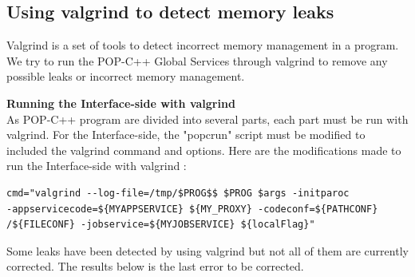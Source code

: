 \subsection{Using valgrind to detect memory leaks}
Valgrind is a set of tools to detect incorrect memory management in a program. We try to run the POP-C++ Global Services through valgrind to remove any possible leaks or incorrect memory management. \s

\textbf{Running the Interface-side with valgrind}\\
As POP-C++ program are divided into several parts, each part must be run with valgrind. For the Interface-side, the "popcrun" script must be modified to included the valgrind command and options. Here are the modifications made to run the Interface-side with valgrind : \s

\begin{lstlisting}
cmd="valgrind --log-file=/tmp/$PROG$$ $PROG $args -initparoc 
-appservicecode=${MYAPPSERVICE} ${MY_PROXY} -codeconf=${PATHCONF}
/${FILECONF} -jobservice=${MYJOBSERVICE} ${localFlag}"
\end{lstlisting}\s

Some leaks have been detected by using valgrind but not all of them are currently corrected. The results below is the last error to be corrected. 

